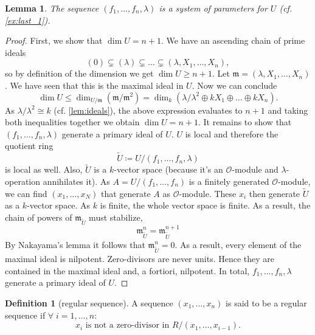 \documentclass{article}
\theoremstyle{plain}%
\newtheorem{lemma}[theorem]{Lemma}
\theoremstyle{definition}
\newtheorem{definition}[theorem]{Definition}
\theoremstyle{remark}
\begin{document}
\begin{lemma}\label{lem:sys_params}\textup{\cite[lemma 5.10]{Darmon1995}}
    The sequence \((f_1, \dots, f_n, \lambda)\) is a system of parameters for \(U\) (cf. \cref{ex:last_1}).
\end{lemma}
\begin{proof}
    First, we show that \(\dim U = n + 1\).
    We have an ascending chain of prime ideals
    \[
        (0) \subsetneq (\lambda) \subsetneq \dots \subsetneq (\lambda, X_1, \dots, X_n),  
    \]
    so by definition of the dimension we get \(\dim U \geq n + 1\).
    Let \(\mathfrak{m} = (\lambda, X_1, \dots, X_n)\). We have seen that this is the maximal ideal in \(U\).
    Now we can conclude
    \[
        \dim U \leq \dim_{U/\mathfrak{m}}(\mathfrak{m}/\mathfrak{m}^2) 
        = \dim_k(\lambda/\lambda^2 \oplus k X_1 \oplus \dots \oplus k X_n).
    \]
    As \(\lambda/\lambda^2 \cong k\) (cf. \cref{lem:ideals}), the above expression evaluates to \(n+1\) and
    taking both inequalities together we obtain \(\dim U = n + 1\).
    It remains to show that \((f_1, \dots, f_n, \lambda)\) generate a primary ideal of \(U\).
    \(U\) is local and therefore the quotient ring 
    \[\tilde{U} \coloneqq U/(f_1, \dots, f_n, \lambda)\] 
    is local as well.
    Also, \(\tilde U\) is a \(k\)-vector space (because it's an \(\mathcal{O}\)-module and \(\lambda\)-operation
    annihilates it). As \(A = U/(f_1, \dots, f_n)\) is a finitely generated \(\mathcal{O}\)-module, we can find
    \((x_1, \dots, x_N)\) that generate \(A\) as \(\mathcal{O}\)-module.
    These \(x_i\) then generate \(\tilde U\) as a \(k\)-vector space.
    As \(k\) is finite, the whole vector space is finite.
    As a result, the chain of powers of \(\mathfrak{m}_{\tilde U}\) must stabilize,
    \[
        \mathfrak{m}_{\tilde U}^n = \mathfrak{m}_{\tilde U}^{n+1}
    \]
    By Nakayama's lemma it follows that \(\mathfrak{m}_{\tilde U}^n = 0\).
    As a result, every element of the maximal ideal is nilpotent.
    Zero-divisors are never units. Hence they are contained in the maximal ideal and, a fortiori, nilpotent.
    In total, \(f_1, \dots, f_n, \lambda\) generate a primary ideal of \(U\).
\end{proof}

\begin{definition}[regular sequence]\cite[cf.][\S 16]{Matsumura1986}
    A sequence \((x_1, \dots, x_n)\) is said to be a regular sequence 
    if \(\forall\; i = 1, \dots, n\colon\)
    \[x_i \text{ is not a zero-divisor in } R/(x_1, \dots, x_{i-1}).\]
\end{definition}
\end{document}
